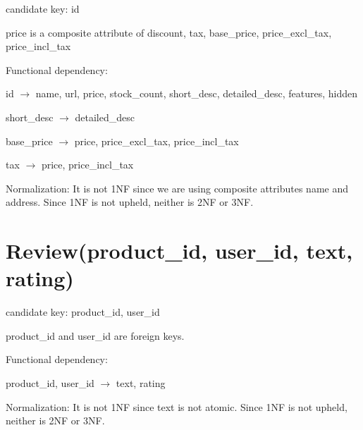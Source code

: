 \documentclass{article}
\begin{document}
candidate key: {id}

price is a composite attribute of discount, tax, base\_price, price\_excl\_tax, price\_incl\_tax



Functional dependency:

id $\rightarrow$ name, url, price, stock\_count, short\_desc, detailed\_desc, features, hidden


short\_desc $\rightarrow$ detailed\_desc


base\_price $\rightarrow$ price, price\_excl\_tax,
price\_incl\_tax


tax  $\rightarrow$ price, price\_incl\_tax

Normalization: It is not 1NF since we are using composite attributes name and address. Since 1NF is not upheld, neither is 2NF or 3NF.




\section{Review(product\_id, user\_id, text, rating)}


candidate key: {product\_id, user\_id}

product\_id and user\_id are foreign keys.


Functional dependency:

product\_id, user\_id $\rightarrow$ text, rating

Normalization: It is not 1NF since text is not atomic. Since 1NF is not upheld, neither is 2NF or 3NF.
\end{document}
